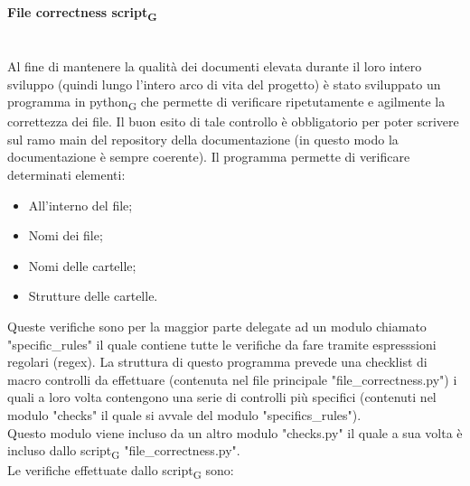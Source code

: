 \paragraph{File correctness script\textsubscript{G}}\mbox{}\\
Al fine di mantenere la qualità dei documenti elevata durante il loro intero sviluppo (quindi lungo l'intero arco di vita del progetto) è stato sviluppato un programma in python\textsubscript{G} che permette di verificare ripetutamente e agilmente la correttezza dei file.
Il buon esito di tale controllo è obbligatorio per poter scrivere sul ramo main del repository della documentazione (in questo modo la documentazione è sempre coerente).
Il programma permette di verificare determinati elementi:
\begin{itemize}
	\item All'interno del file;
	\item Nomi dei file;
	\item Nomi delle cartelle;
	\item Strutture delle cartelle.
\end{itemize}
\noindent Queste verifiche sono per la maggior parte delegate ad un modulo chiamato "specific\_rules" il quale contiene tutte le verifiche da fare tramite espresssioni regolari (regex). 
La struttura di questo programma prevede una checklist di macro controlli da effettuare (contenuta nel file principale "file\_correctness.py") i quali a loro volta contengono una serie di controlli più specifici (contenuti nel modulo "checks" il quale si avvale del modulo "specifics_rules").\\
Questo modulo viene incluso da un altro modulo "checks.py" il quale a sua volta è incluso dallo script\textsubscript{G} "file\_correctness.py".\\
\noindent Le verifiche effettuate dallo script\textsubscript{G} sono:
